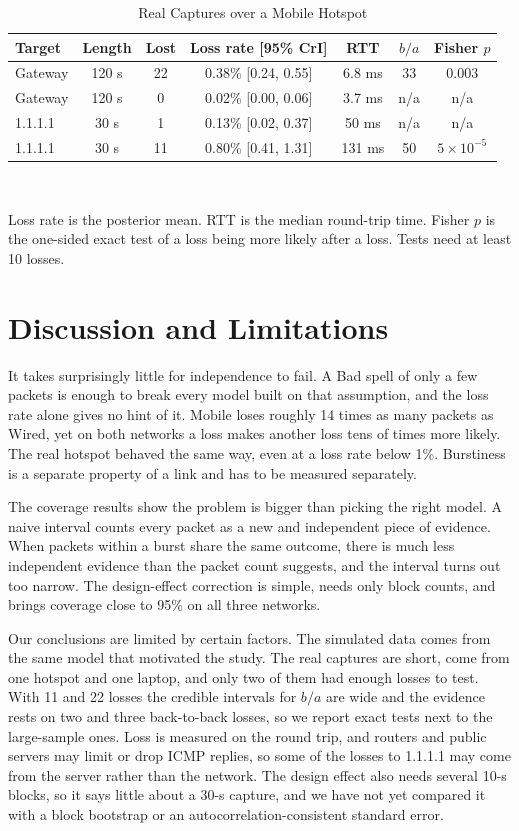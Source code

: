 \documentclass[conference]{IEEEtran}
\begin{document}
\begin{table}[!t]
\caption{Real Captures over a Mobile Hotspot}
\label{tab:real}
\centering
\footnotesize
\setlength{\tabcolsep}{2.6pt}
\begin{tabular}{lcccccc}
\toprule
Target & Length & Lost & Loss rate [95\% CrI] & RTT & $b/a$ & Fisher $p$ \\
\midrule
Gateway & 120 s & 22 & 0.38\% [0.24, 0.55] & 6.8 ms & 33 & 0.003 \\
Gateway & 120 s & 0 & 0.02\% [0.00, 0.06] & 3.7 ms & n/a & n/a \\
1.1.1.1 & 30 s & 1 & 0.13\% [0.02, 0.37] & 50 ms & n/a & n/a \\
1.1.1.1 & 30 s & 11 & 0.80\% [0.41, 1.31] & 131 ms & 50 & $5\times10^{-5}$ \\
\bottomrule
\end{tabular}
\\[2pt]
\raggedright\scriptsize Loss rate is the posterior mean. RTT is the median round-trip time. Fisher $p$ is the one-sided exact test of a loss being more likely after a loss. Tests need at least 10 losses.
\end{table}

\section{Discussion and Limitations}
It takes surprisingly little for independence to fail. A Bad spell of only a few packets is enough to break every model built on that assumption, and the loss rate alone gives no hint of it. Mobile loses roughly 14 times as many packets as Wired, yet on both networks a loss makes another loss tens of times more likely. The real hotspot behaved the same way, even at a loss rate below 1\%. Burstiness is a separate property of a link and has to be measured separately.

The coverage results show the problem is bigger than picking the right model. A naive interval counts every packet as a new and independent piece of evidence. When packets within a burst share the same outcome, there is much less independent evidence than the packet count suggests, and the interval turns out too narrow. The design-effect correction is simple, needs only block counts, and brings coverage close to 95\% on all three networks.

Our conclusions are limited by certain factors. The simulated data comes from the same model that motivated the study. The real captures are short, come from one hotspot and one laptop, and only two of them had enough losses to test. With 11 and 22 losses the credible intervals for $b/a$ are wide and the evidence rests on two and three back-to-back losses, so we report exact tests next to the large-sample ones. Loss is measured on the round trip, and routers and public servers may limit or drop ICMP replies, so some of the losses to 1.1.1.1 may come from the server rather than the network. The design effect also needs several 10-s blocks, so it says little about a 30-s capture, and we have not yet compared it with a block bootstrap or an autocorrelation-consistent standard error.
\end{document}
